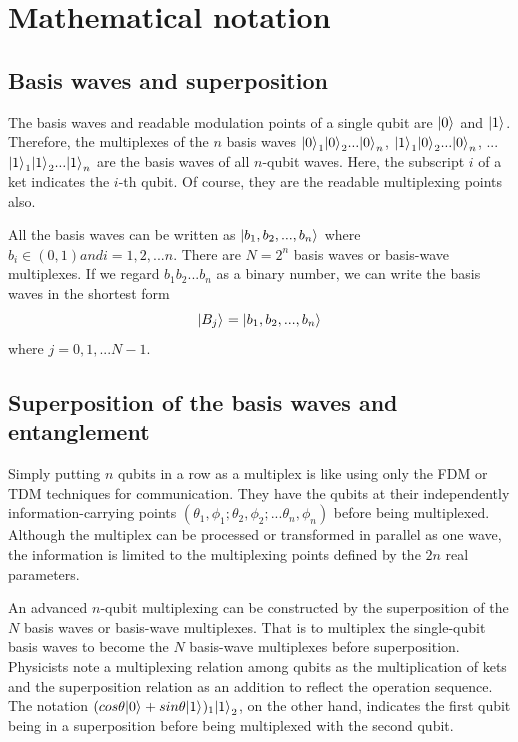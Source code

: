 \documentclass[oneside, letter, 12pt]{book}
\begin{document}
\section{Mathematical notation}

\subsection{Basis waves and superposition}
The basis waves and readable modulation points of a single qubit are $\vert {0} \rangle_{}$ and $\vert {1} \rangle_{}$. Therefore, the multiplexes of the $n$ basis waves ${\vert {0} \rangle_{}}_1 {\vert {0} \rangle_{}}_2 ... {\vert {0} \rangle_{}}_n$,  ${\vert {1} \rangle_{}}_1 {\vert {0} \rangle_{}}_2 ... {\vert {0} \rangle_{}}_n$, ... ${\vert {1} \rangle_{}}_1 {\vert {1} \rangle_{}}_2 ... {\vert {1} \rangle_{}}_n$ are the basis waves of all $n$-qubit waves. Here, the subscript $i$ of a ket indicates the $i$-th qubit. Of course, they are the readable multiplexing points also.

All the basis waves can be written as $\vert {b_1, b_2, ..., b_n} \rangle_{}$ where $b_i \in (0,1) and i=1, 2, ... n$. There are $N=2^n$ basis waves or basis-wave multiplexes. If we regard $b_1 b_2 ... b_n$ as a binary number, we can write the basis waves in the shortest form
\begin{equation}
    \vert {B_j} \rangle_{} = \vert {b_1, b_2, ..., b_n} \rangle_{}
\end{equation}
where $j=0, 1, ... N-1$.

\subsection{Superposition of the basis waves and entanglement}
Simply putting $n$ qubits in a row as a multiplex is like using only the FDM or TDM techniques for communication. They have the qubits at their independently information-carrying points $(\theta_1, \phi_1; \theta_2, \phi_2; ... \theta_n, \phi_n)$ before being multiplexed. Although the multiplex can be processed or transformed in parallel as one wave, the information is limited to the multiplexing points defined by the $2n$ real parameters.

An advanced $n$-qubit multiplexing can be constructed by the superposition of the $N$ basis waves or basis-wave multiplexes. That is to multiplex the single-qubit basis waves to become the $N$ basis-wave multiplexes before superposition. Physicists note a multiplexing relation among qubits as the multiplication of kets and the superposition relation as an addition to reflect the operation sequence. The notation $(cos\theta \vert {0} \rangle_{} + sin\theta \vert {1} \rangle_{})_1 {\vert {1} \rangle_{}}_2$, on the other hand, indicates the first qubit being in a superposition before being multiplexed with the second qubit.
\end{document}
